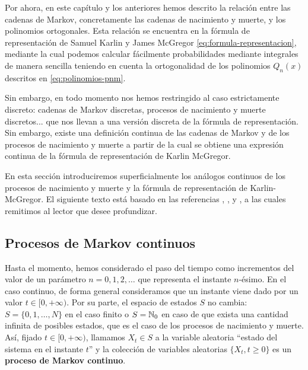     Por ahora, en este capítulo y los anteriores hemos descrito la relación entre las cadenas de Markov, concretamente las cadenas de nacimiento y muerte, y los polinomios ortogonales. Esta relación se encuentra en la fórmula de representación de Samuel Karlin y James McGregor \eqref{eq:formula-representacion}, mediante la cual podemos calcular fácilmente probabilidades mediante integrales de manera sencilla teniendo en cuenta la ortogonalidad de los polinomios $Q_n(x)$ descritos en \eqref{eq:polinomios-pnm}.

    Sin embargo, en todo momento nos hemos restringido al caso estrictamente discreto: cadenas de Markov discretas, procesos de nacimiento y muerte discretos... que nos llevan a una versión discreta de la fórmula de representación. Sin embargo, existe una definición continua de las cadenas de Markov y de los procesos de nacimiento y muerte a partir de la cual se obtiene una expresión continua de la fórmula de representación de Karlin McGregor.

    En esta sección introduciremos superficialmente los análogos continuos de los procesos de nacimiento y muerte y la fórmula de representación de Karlin-McGregor. El siguiente texto está basado en las referencias \cite{Anderson}, \cite[Ch. 2, 3]{schoutens-2000}, \cite{differential-equations} y \cite[Ch. III, Sections 3.1, 3.2]{Manuel}, a las cuales remitimos al lector que desee profundizar.

    \subsection{Procesos de Markov continuos}

    Hasta el momento, hemos considerado el paso del tiempo como incrementos del valor de un parámetro $n=0,1,2,\dots$ que representa el instante $n$-ésimo. En el caso continuo, de forma general consideramos que un instante viene dado por un valor $t\in[0,+\infty)$. Por su parte, el espacio de estados $S$ no cambia: $S=\{0,1,\dots,N\}$ en el caso finito o $S=\mathbb{N}_0$ en caso de que exista una cantidad infinita de posibles estados, que es el caso de los procesos de nacimiento y muerte. Así, fijado $t\in[0,+\infty)$, llamamos $X_t\in S$ a la variable aleatoria ``estado del sistema en el instante $t$'' y la colección de variables aleatorias $\{X_t, t\geq 0\}$ es un \textbf{proceso de Markov continuo}.
    
